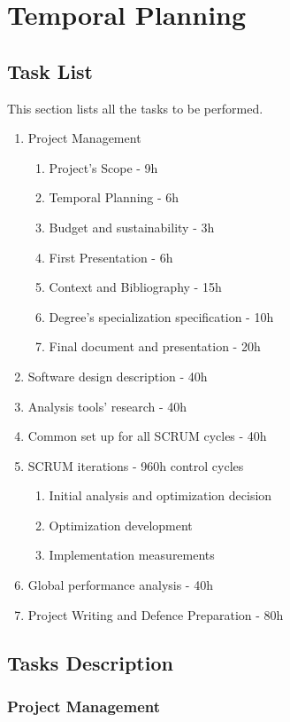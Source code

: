 \chapter{Temporal Planning}
\label{sec:temporal_planning}


\section{Task List}

This section lists all the tasks to be performed. 

\begin{enumerate}
\item Project Management
\begin{enumerate}
\item Project's Scope - 9h
\item Temporal Planning - 6h
\item Budget and sustainability - 3h
\item First Presentation - 6h
\item Context and Bibliography - 15h
\item Degree's specialization specification - 10h
\item Final document and presentation - 20h
\end{enumerate}
\item Software design description - 40h
\item Analysis tools' research - 40h
\item Common set up for all SCRUM cycles - 40h
\item SCRUM iterations - 960h control cycles
\begin{enumerate}
\item Initial analysis and optimization decision
\item Optimization development
\item Implementation measurements
\end{enumerate}
\item Global performance analysis - 40h

\item Project Writing and Defence Preparation - 80h
\end{enumerate}

\section{Tasks Description}


\subsection{Project Management}

